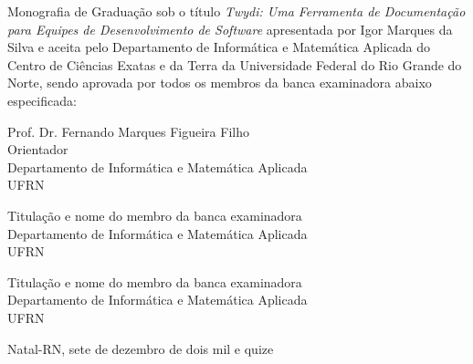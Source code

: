 \begin{folhadeaprovacao}
	\setlength{\ABNTsignthickness}{0.4pt}
	\setlength{\ABNTsignwidth}{10cm}

	\noindent
	Monografia de Graduação sob o título \textit{Twydi: Uma Ferramenta de Documentação para Equipes de Desenvolvimento de Software} apresentada por
	Igor Marques da Silva e aceita pelo Departamento de Informática e Matemática Aplicada do
	Centro de Ciências Exatas e da Terra da Universidade Federal do Rio Grande do Norte,
	sendo aprovada por todos os membros da banca examinadora abaixo especificada:

	\assinatura
	{
		Prof. Dr. Fernando Marques Figueira Filho\\
		{\small Orientador} 															\\
		{\footnotesize
			Departamento de Informática e Matemática Aplicada 																	\\
		  	UFRN
		}
	}

	\assinatura
	{
		Titulação e nome do membro da banca examinadora 						 \\
		{\footnotesize
			Departamento de Informática e Matemática Aplicada 																	\\
		  	UFRN
		}
	}

	\assinatura
	{
		Titulação e nome do membro da banca examinadora 						 \\
		{\footnotesize
			Departamento de Informática e Matemática Aplicada 																	\\
		  	UFRN
		}
	}

	\vfill

	\begin{center}
		Natal-RN, sete de dezembro de dois mil e quize
	\end{center}
\end{folhadeaprovacao}
